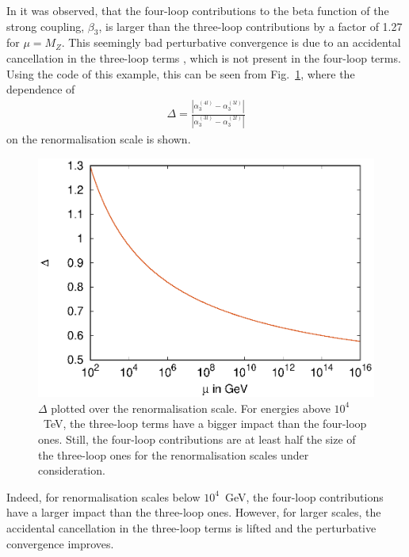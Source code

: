 \documentclass[11pt,a4paper]{article}
\begin{document}
In \cite{Davies:2019onf} it was observed, that the four-loop contributions to the
beta function of the strong coupling, $\beta_3$, is larger than the three-loop contributions by a factor of 1.27 for $\mu = M_Z$. This seemingly bad perturbative convergence
is due to an accidental cancellation in the three-loop terms \cite{Davies:2019onf}, which is not present in the four-loop terms. Using the code of this example, this can be seen from Fig.~\ref{plt::delta}, where the dependence of
\begin{align}
\Delta = \frac{|\alpha_3^{(4l)} - \alpha_3^{(3l)}|}{|\alpha_3^{(3l)} - \alpha_3^{(2l)}|}
\end{align}
on the renormalisation scale is shown.
\begin{figure}
\centering
\includegraphics{delta_running.eps}
\caption{\label{plt::delta} $\Delta$ plotted over the renormalisation scale. For energies above $10^4$~TeV, the three-loop terms have a bigger impact than the four-loop ones. Still,
the four-loop contributions are at least half the size of the three-loop ones for the renormalisation scales under consideration.}
\end{figure}
Indeed, for renormalisation scales below $10^4$~GeV, the four-loop contributions have a larger impact than the three-loop ones. However, for larger scales,
the accidental cancellation in the three-loop terms is lifted and the perturbative convergence improves.
\end{document}
